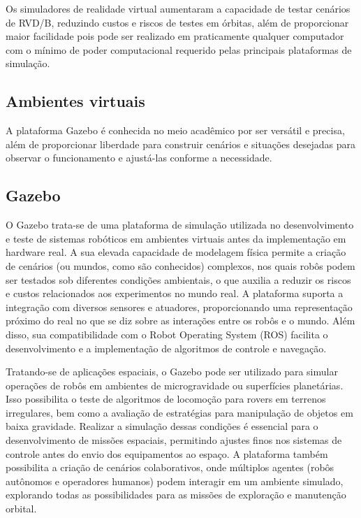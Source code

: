 Os simuladores de realidade virtual aumentaram a capacidade de testar cenários de RVD/B, reduzindo custos e riscos de testes em órbitas, além de proporcionar maior facilidade pois pode ser realizado em praticamente qualquer computador com o mínimo de poder computacional requerido pelas principais plataformas de simulação.

\subsection{Ambientes virtuais}

A plataforma Gazebo \citep{gazebo2025} é conhecida no meio acadêmico por ser versátil e precisa, além de proporcionar liberdade para construir cenários e situações desejadas para observar o funcionamento e ajustá-las conforme a necessidade.

\subsection{Gazebo}

O Gazebo trata-se de uma plataforma de simulação utilizada no desenvolvimento e teste de sistemas robóticos em ambientes virtuais antes da implementação em hardware real. A sua elevada capacidade de modelagem física permite a criação de cenários (ou mundos, como são conhecidos) complexos, nos quais robôs podem ser testados sob diferentes condições ambientais, o que auxilia a reduzir os riscos e custos relacionados aos experimentos no mundo real. A plataforma suporta a integração com diversos sensores e atuadores, proporcionando uma representação próximo do real no que se diz sobre as interações entre os robôs e o mundo. Além disso, sua compatibilidade com o Robot Operating System (ROS) facilita o desenvolvimento e a implementação de algoritmos de controle e navegação.

Tratando-se de aplicações espaciais, o Gazebo pode ser utilizado para simular operações de robôs em ambientes de microgravidade ou superfícies planetárias. Isso possibilita o teste de algoritmos de locomoção para rovers em terrenos irregulares, bem como a avaliação de estratégias para manipulação de objetos em baixa gravidade. Realizar a simulação dessas condições é essencial para o desenvolvimento de missões espaciais, permitindo ajustes finos nos sistemas de controle antes do envio dos equipamentos ao espaço. A plataforma também possibilita a criação de cenários colaborativos, onde múltiplos agentes (robôs autônomos e operadores humanos) podem interagir em um ambiente simulado, explorando todas as possibilidades para as missões de exploração e manutenção orbital.

